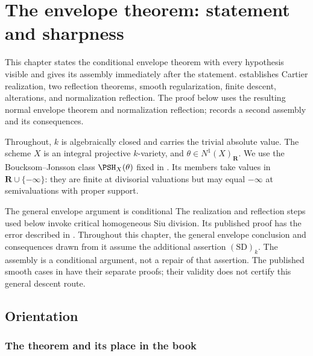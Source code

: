 \chapter{The envelope theorem: statement and sharpness}
\label{chap:bj-envelope-statement}

This chapter states the conditional envelope theorem with every hypothesis
visible and gives its assembly immediately after the statement.
establishes Cartier realization, two reflection theorems, smooth
regularization, finite descent, alterations, and normalization reflection.
The proof below uses the resulting normal envelope theorem and normalization
reflection;  records a second assembly
and its consequences.

Throughout, $k$ is algebraically closed and carries the trivial absolute
value.  The scheme $X$ is an integral projective $k$-variety, and
$\theta\in N^1(X)_{\mathbf R}$.  We use the Boucksom--Jonsson class
$\PSH_X(\theta)$ fixed in
.  Its members take values in
$\mathbf R\cup\{-\infty\}$: they are finite at divisorial valuations but
may equal $-\infty$ at semivaluations with proper support.


\begin{warning}{The general envelope argument is conditional}
\label{warn:ch37-siu-dependency}
The realization and reflection steps used below invoke critical homogeneous
Siu division. Its published proof has the error described in
. Throughout this chapter, the general
envelope conclusion and consequences drawn from it assume the additional
assertion $\mathrm{(SD)}_k$. The assembly is a conditional argument, not a
repair of that assertion. The published smooth cases in
 have their separate
proofs; their validity does not certify this general descent route.
\end{warning}

\section{Orientation}
\label{sec:ch37-orientation}

\subsection{The theorem and its place in the book}

